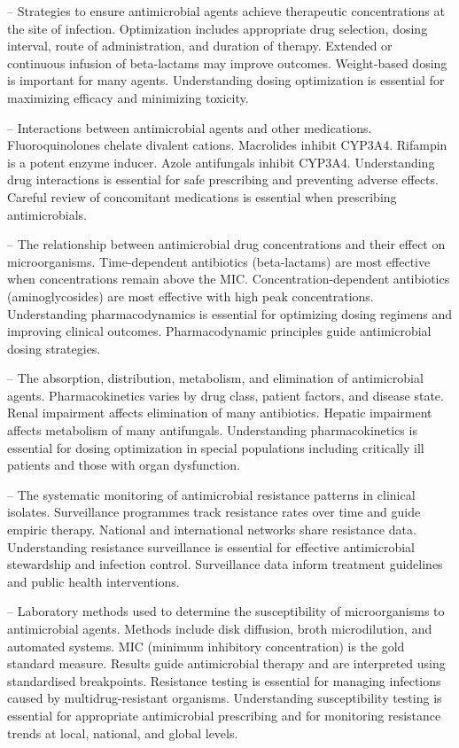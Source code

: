 -- Strategies to ensure antimicrobial agents achieve therapeutic concentrations at the site of infection. Optimization includes appropriate drug selection, dosing interval, route of administration, and duration of therapy. Extended or continuous infusion of beta-lactams may improve outcomes. Weight-based dosing is important for many agents. Understanding dosing optimization is essential for maximizing efficacy and minimizing toxicity.

-- Interactions between antimicrobial agents and other medications. Fluoroquinolones chelate divalent cations. Macrolides inhibit CYP3A4. Rifampin is a potent enzyme inducer. Azole antifungals inhibit CYP3A4. Understanding drug interactions is essential for safe prescribing and preventing adverse effects. Careful review of concomitant medications is essential when prescribing antimicrobials.

-- The relationship between antimicrobial drug concentrations and their effect on microorganisms. Time-dependent antibiotics (beta-lactams) are most effective when concentrations remain above the MIC. Concentration-dependent antibiotics (aminoglycosides) are most effective with high peak concentrations. Understanding pharmacodynamics is essential for optimizing dosing regimens and improving clinical outcomes. Pharmacodynamic principles guide antimicrobial dosing strategies.

-- The absorption, distribution, metabolism, and elimination of antimicrobial agents. Pharmacokinetics varies by drug class, patient factors, and disease state. Renal impairment affects elimination of many antibiotics. Hepatic impairment affects metabolism of many antifungals. Understanding pharmacokinetics is essential for dosing optimization in special populations including critically ill patients and those with organ dysfunction.

-- The systematic monitoring of antimicrobial resistance patterns in clinical isolates. Surveillance programmes track resistance rates over time and guide empiric therapy. National and international networks share resistance data. Understanding resistance surveillance is essential for effective antimicrobial stewardship and infection control. Surveillance data inform treatment guidelines and public health interventions.

-- Laboratory methods used to determine the susceptibility of microorganisms to antimicrobial agents. Methods include disk diffusion, broth microdilution, and automated systems. MIC (minimum inhibitory concentration) is the gold standard measure. Results guide antimicrobial therapy and are interpreted using standardised breakpoints. Resistance testing is essential for managing infections caused by multidrug-resistant organisms. Understanding susceptibility testing is essential for appropriate antimicrobial prescribing and for monitoring resistance trends at local, national, and global levels.

